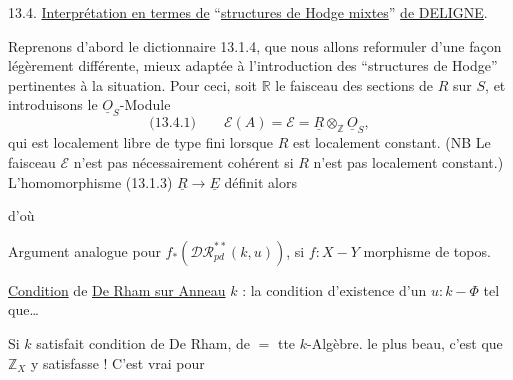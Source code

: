 13.4. \uline{Interprétation en termes de} ``\uline{structures de Hodge mixtes}'' \uline{de DELIGNE}.

Reprenons d'abord le dictionnaire 13.1.4, que nous allons reformuler d'une façon légèrement différente, mieux adaptée à l'introduction des ``structures de Hodge'' pertinentes à la situation. Pour ceci, soit $\mathbb R$ le faisceau des sections de $R$ sur $S$, et introduisons le $\underline O_S$-Module
\[
\text{(13.4.1)}\qquad \mathcal E(A)=\mathcal E=\underline R\otimes_{\mathbb Z}\underline O_S,
\]
qui est localement libre de type fini lorsque $R$ est localement constant. (NB Le faisceau $\mathcal E$ n'est pas nécessairement cohérent si $R$ n'est pas localement constant.) L'homomorphisme (13.1.3) $\underline R\longrightarrow\underline E$ définit alors



d'où

Argument analogue pour $f_*(\mathcal{DR}_{pd}^{**}(k,u))$, si $f:X\mathbin{-}Y$ morphisme de topos.

\uline{Condition} de \uline{De Rham sur Anneau} $k$ : la condition d'existence d'un $u:k\mathbin{-}\Phi$ tel que\ldots

Si $k$ satisfait condition de De Rham, de $=$ tte $k$-Algèbre.  le plus beau, c'est que $\mathbb Z_X$ y satisfasse ! C'est vrai pour

